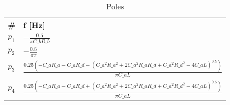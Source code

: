 \begin{table}[H]
\centering
\begin{tabular}[c]{ll}
\textbf{\#} & \textbf{f [Hz]} \\ 
\rowcolor{myyellow}
$p_{1}$ &\small{$- \frac{0.5}{\pi C\_{b} R\_{b}}$} \\ 
$p_{2}$ &\small{$- \frac{0.5}{\pi \tau}$} \\ 
\rowcolor{myyellow}
$p_{3}$ &\small{$\frac{0.25 \left(- C\_{a} R\_{a} - C\_{a} R\_{d} - \left(C\_{a}^{2} R\_{a}^{2} + 2 C\_{a}^{2} R\_{a} R\_{d} + C\_{a}^{2} R\_{d}^{2} - 4 C\_{a} L\right)^{0.5}\right)}{\pi C\_{a} L}$} \\ 
$p_{4}$ &\small{$\frac{0.25 \left(- C\_{a} R\_{a} - C\_{a} R\_{d} + \left(C\_{a}^{2} R\_{a}^{2} + 2 C\_{a}^{2} R\_{a} R\_{d} + C\_{a}^{2} R\_{d}^{2} - 4 C\_{a} L\right)^{0.5}\right)}{\pi C\_{a} L}$} \\ 
\end{tabular}
\caption{Poles}
\end{table}

